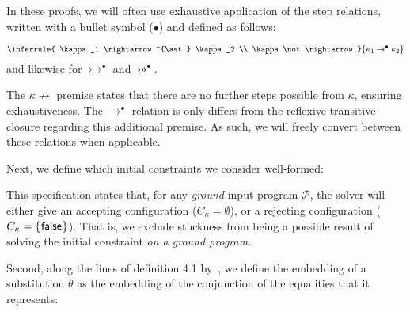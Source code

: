 In these proofs, we will often use exhaustive application of the step relations, written with a bullet symbol ($\bullet$) and defined as follows:

\begin{definition}
  \[
    \inferrule{
      \kappa_1 \rightarrow^{\ast} \kappa_2 \\ \kappa \not\rightarrow
    }{
      \kappa_1 \rightarrow^{\bullet} \kappa_2
    }
  \]
  and likewise for $\rightarrowtail^{\bullet}$ and $\twoheadrightarrowtail^{\bullet}$.
\end{definition}

The $\kappa \not\rightarrow$ premise states that there are no further steps possible from $\kappa$, ensuring exhaustiveness.
The $\rightarrow^{\bullet}$ relation is only differs from the reflexive transitive closure regarding this additional premise.
As such, we will freely convert between these relations when applicable.

Next, we define which initial constraints we consider well-formed:

\begin{definition}
  \label{conj:wellformed-spec}
  \begin{mathpar}
  \end{mathpar}
\end{definition}

This specification states that, for any \emph{ground} input program $\mathcal{P}$, the solver will either give an accepting configuration ($C_\kappa = \emptyset$),
or a rejecting configuration ($C_\kappa = \set{\cFalse}$).
That is, we exclude stuckness from being a possible result of solving the initial constraint \emph{on a ground program}.

\pagebreak[4]  %

Second, along the lines of definition 4.1 by~\citet{RouvoetAPKV20}, we define the embedding of a substitution $\theta$ as the embedding of the conjunction of the equalities that it represents:

